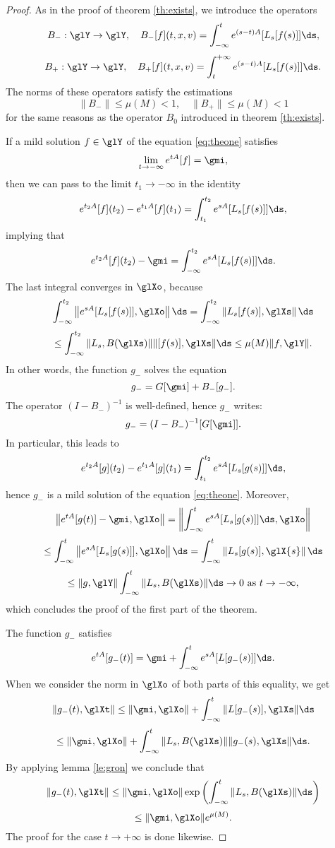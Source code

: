 \begin{proof}
	As in the proof of   theorem \ref{th:exists}, we introduce the operators
	\[B_-:\glY\to\glY,\quad B_-[f](t,x,v)=\int_{-\infty}^{t}e^{(s-t)A}[L_s[f(s)]]\ds,\]
	\[B_+:\glY\to\glY,\quad B_+[f](t,x,v)=\int_{t}^{+\infty}e^{(s-t)A}[L_s[f(s)]]\ds.\]
	The norms of these operators satisfy the estimations 
	\[\|B_-\|\le  \mu(M)<1,\quad \|B_+\|\le  \mu(M)<1\] for the same reasons as the operator $B_0$ introduced in   theorem \ref{th:exists}. 

	If a mild solution $f\in \glY$ of the equation \eqref{eq:theone} satisfies \[\lim_{t\to- \infty}e^{tA}[f] = \gmi,\] then we can pass to the limit $t_1\to -\infty$ in the identity
	\[e^{t_2A}[f](t_2)-e^{t_1A}[f](t_1) = \int_{t_1}^{t_2}e^{sA}[L_s[f(s)]]\ds,\]
	 implying that 
	\[e^{t_2A}[f](t_2)-\gmi  = \int_{ -\infty}^{t_2}e^{sA}[L_s[f(s)]]\ds.\]
	The last integral converges in $\glXo$, because
	\[\int_{ -\infty}^{t_2}\left\|e^{sA}[L_s[f(s)]],\glXo\right\|\ds=%
	\int_{ -\infty}^{t_2}\left\| L_s[f(s)] ,\glXs\right\|\ds\]
	\[\le\int_{ -\infty}^{t_2} \| L_s,B(\glXs)\|\|[f(s)] ,\glXs\|\ds\le \mu(M) \|f,\glY\|.\]
	In other words, the function $g_-$ solves the equation
	\[g_-=G[\gmi]+B_-[g_-].\]
	The operator $(I-B_-)^{-1}$ is well-defined, hence $g_-$ writes:
	\[g_-=(I-B_-)^{-1}[G[\gmi]].\] 
	In particular, this leads to 
	\[e^{t_2A}[g](t_2)-e^{t_1A}[g](t_1) = \int_{t_1}^{t_2}e^{ s A}[L_s[g(s)]]\ds,\]
	hence $g_-$ is a mild solution of the equation \eqref{eq:theone}. Moreover,
	\[\left\|e^{tA}[g(t)]-\gmi,\glXo\right\| = \left\|\int_{-\infty}^{t}e^{ s  A}[L_s[g(s)]]\ds,\glXo\right\|\]
	\[\le\int_{-\infty}^{t}\left\|e^{ s  A}[L_s[g(s)]],\glXo\right\|\ds=\int_{-\infty}^{t}\left\| L_s[g(s) ],\glX{s}\right\|\ds \]
	\[\le \|g,\glY\|\int_{-\infty}^{t} \|L_s,B(\glXs)\|\ds\to 0\mbox{ as }t\to- \infty,\]
	which concludes the proof of the first part of the theorem.

		
	The function $g_-$ satisfies
	\[e^{tA}[g_-(t)]=\gmi+\int_{-\infty}^{t}e^{sA}[L[g_-(s)]]\ds.\]
	When we consider the norm in $\glXo$ of both parts of this equality, we get
	\[\|g_-(t),\glXt\|\le \|\gmi,\glXo\|+ \int_{-\infty}^{t} \|L[g_-(s)],\glXs\| \ds\]
	\[\le \|\gmi,\glXo\|+ \int_{-\infty}^{t} \|L_s,B(\glXs)\|\| g_-(s),\glXs\| \ds.\]
	By applying  %
	 lemma \ref{le:gron}
	   we conclude that
	\[\|g_-(t),\glXt\|\le \|\gmi,\glXo\| \exp\left(\int_{-\infty}^{t} \|L_s,B(\glXs)\| \ds\right)\]\[\le \|\gmi,\glXo\|  e^{\mu(M) }.   \]
	The proof for the case   $t\to+\infty$ is done likewise.
\end{proof}

